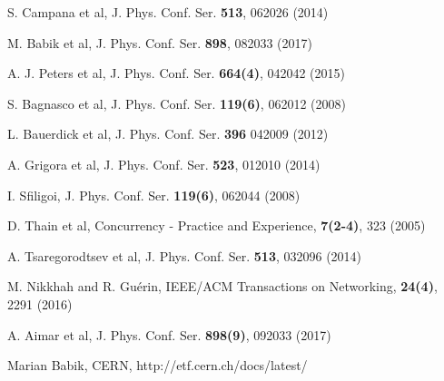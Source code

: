 \begin{thebibliography}{}
%
%


S. Campana et al, J. Phys. Conf. Ser. {\bf513}, 062026 (2014)

M. Babik et al, J. Phys. Conf. Ser. {\bf898}, 082033 (2017)


 A. J. Peters et al, J. Phys. Conf. Ser. {\bf664(4)}, 042042 (2015)



S. Bagnasco et al, J. Phys. Conf. Ser. {\bf119(6)}, 062012 (2008)

L. Bauerdick et al, J. Phys. Conf. Ser. {\bf 396} 042009 (2012)

A. Grigora et al, J. Phys. Conf. Ser. {\bf523}, 012010 (2014)

I. Sfiligoi, J. Phys. Conf. Ser. {\bf119(6)}, 062044 (2008)

D. Thain et al, Concurrency - Practice and Experience, {\bf 7(2-4)}, 323 (2005)

 A. Tsaregorodtsev et al, J. Phys. Conf. Ser. {\bf513}, 032096 (2014)



M. Nikkhah and R. Gu\'erin, 
IEEE/ACM Transactions on Networking, {\bf 24(4)}, 2291 (2016)

A. Aimar et al, J. Phys. Conf. Ser. {\bf 898(9)}, 092033 (2017)


Marian Babik, CERN,
http://etf.cern.ch/docs/latest/


\end{thebibliography}
